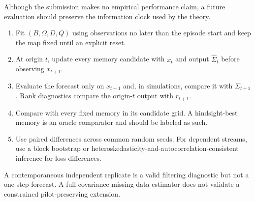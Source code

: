 Although the submission makes no empirical performance claim, a future evaluation should preserve the information clock used by the theory.
\begin{enumerate}
 \item Fit $(B,\Omega,D,Q)$ using observations no later than the episode start and keep the map fixed until an explicit reset.
 \item At origin $t$, update every memory candidate with $x_t$ and output $\widehat\Sigma_t$ before observing $x_{t+1}$.
 \item Evaluate the forecast only on $x_{t+1}$ and, in simulations, compare it with $\Sigma_{t+1}$.  Rank diagnostics compare the origin-$t$ output with $r_{t+1}$.
 \item Compare \ATLAS with every fixed memory in its candidate grid.  A hindsight-best memory is an oracle comparator and should be labeled as such.
 \item Use paired differences across common random seeds.  For dependent streams, use a block bootstrap or heteroskedasticity-and-autocorrelation-consistent inference for loss differences.
\end{enumerate}
A contemporaneous independent replicate is a valid filtering diagnostic but not a one-step forecast.  A full-covariance missing-data estimator does not validate a constrained pilot-preserving extension.
